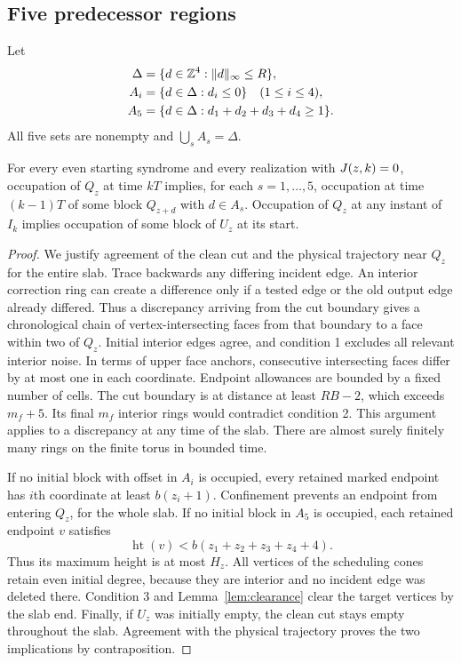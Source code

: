 \subsection{Five predecessor regions}

Let
\begin{equation}\label{eq:regions}
 \begin{split}
 \Delta&=\{d\in\mathbb Z^4:\|d\|_\infty\le R\},\\
 A_i&=\{d\in\Delta:d_i\le0\}\quad(1\le i\le4),\\
 A_5&=\{d\in\Delta:d_1+d_2+d_3+d_4\ge1\}.
 \end{split}
\end{equation}
All five sets are nonempty and \(\bigcup_s A_s=\Delta\).

\begin{lemma}\label{lem:predecessor}
For every even starting syndrome and every realization with
\(J(z,k)=0\), occupation of \(Q_z\) at time \(kT\) implies, for
each \(s=1,\ldots,5\), occupation at time \((k-1)T\) of some block
\(Q_{z+d}\) with \(d\in A_s\). Occupation of \(Q_z\) at any instant of
\(I_k\) implies occupation of some block of \(U_z\) at its start.
\end{lemma}
\begin{proof}
We justify agreement of the clean cut and the physical trajectory
near \(Q_z\) for the entire slab. Trace backwards any differing
incident edge. An interior correction ring can create a difference
only if a tested edge or the old output edge already differed.
Thus a discrepancy arriving from the cut boundary gives a
chronological chain of vertex-intersecting faces from that boundary
to a face within two of \(Q_z\). Initial interior edges agree, and
condition 1 excludes all relevant interior noise. In terms of upper
face anchors, consecutive intersecting faces differ by at most one
in each coordinate. Endpoint allowances are bounded by a fixed
number of cells. The cut boundary is at distance at least \(RB-2\),
which exceeds \(m_f+5\). Its final \(m_f\) interior rings would
contradict condition 2. This argument applies to a discrepancy at
any time of the slab. There are almost surely finitely many rings
on the finite torus in bounded time.

If no initial block with offset in \(A_i\) is occupied, every retained
marked endpoint has \(i\)th coordinate at least \(b(z_i+1)\).
Confinement prevents an endpoint from entering \(Q_z\), for the whole
slab. If no initial block in \(A_5\) is occupied, each retained
endpoint \(v\) satisfies
\[
 \operatorname{ht}(v)<b(z_1+z_2+z_3+z_4+4).
\]
Thus its maximum height is at most \(H_z\). All vertices of the
scheduling cones retain even initial degree, because they are
interior and no incident edge was deleted there. Condition 3 and
Lemma~\ref{lem:clearance} clear the target vertices by the slab end.
Finally, if \(U_z\) was initially empty, the clean cut stays empty
throughout the slab. Agreement with the physical trajectory proves
the two implications by contraposition.
\end{proof}

